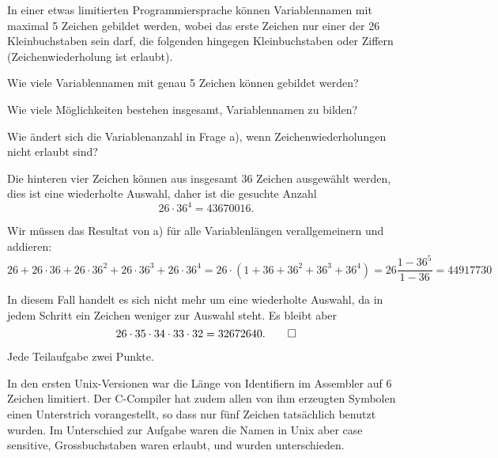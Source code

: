 In einer etwas limitierten Programmiersprache können Variablennamen
mit maximal 5 Zeichen gebildet werden, wobei das erste Zeichen nur
einer der 26 Kleinbuchstaben sein darf, die folgenden hingegen Kleinbuchstaben
oder Ziffern (Zeichenwiederholung ist erlaubt).
\begin{teilaufgaben}
\item
Wie viele Variablennamen mit genau 5 Zeichen können gebildet werden?
\item
Wie viele Möglichkeiten bestehen insgesamt, Variablennamen zu bilden?
\item
Wie ändert sich die Variablenanzahl in Frage a),
wenn Zeichenwiederholungen nicht erlaubt sind?
\end{teilaufgaben}


\begin{loesung}
\begin{teilaufgaben}
\item Die hinteren vier Zeichen können aus insgesamt 36 Zeichen ausgewählt
werden, dies ist eine wiederholte Auswahl, daher ist die gesuchte Anzahl
\[
26\cdot 36^4=43670016.
\]
\item 
Wir müssen das Resultat von a) für alle Variablenlängen verallgemeinern
und addieren:
\[
26
+
26\cdot 36
+
26\cdot 36^2
+
26\cdot 36^3
+
26\cdot 36^4
=
26 \cdot (1 + 36 + 36^2 + 36^3 + 36^4)=26\frac{1-36^5}{1-36}
=
44917730
\]
\item
In diesem Fall handelt es sich nicht mehr um eine wiederholte Auswahl,
da in jedem Schritt ein Zeichen weniger zur Auswahl steht. Es bleibt
aber
\[
26 \cdot 35 \cdot 34 \cdot 33 \cdot 32=32672640.
\qedhere
\]
\end{teilaufgaben}
\end{loesung}

\begin{bewertung}
Jede Teilaufgabe zwei Punkte.
\end{bewertung}

\begin{diskussion}
In den ersten Unix-Versionen war die Länge von Identifiern im Assembler
auf 6 Zeichen limitiert. Der C-Compiler hat zudem allen von ihm 
erzeugten Symbolen einen Unterstrich vorangestellt, so dass nur fünf
Zeichen tatsächlich benutzt wurden. Im Unterschied zur Aufgabe
waren die Namen in Unix aber case sensitive, Grossbuchstaben waren erlaubt,
und wurden unterschieden.
\end{diskussion}


